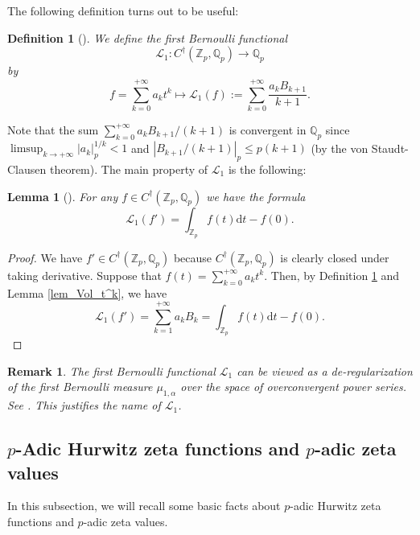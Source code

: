 \documentclass[12pt]{article}
\newtheorem{lemma}[theorem]{Lemma}
\newtheorem{definition}[theorem]{Definition}
\newtheorem{remark}[theorem]{Remark}
\numberwithin{equation}{section}
\begin{document}
The following definition turns out to be useful:

\begin{definition}[{\cite[Definition 2.6]{LS2023+}}]\label{def_L_1}
We define the \emph{first Bernoulli functional} \[\mathcal{L}_1: C^{\dagger}(\mathbb{Z}_p,\mathbb{Q}_p) \longrightarrow \mathbb{Q}_p\] 
by
\[ f = \sum_{k=0}^{+\infty} a_k t^{k} \mapsto \mathcal{L}_1(f) := \sum_{k=0}^{+\infty} \frac{a_kB_{k+1}}{k+1}. \]
\end{definition}
Note that the sum $\sum_{k=0}^{+\infty} a_kB_{k+1}/(k+1)$ is convergent in $\mathbb{Q}_p$ since $\limsup_{k \to +\infty} |a_k|_p^{1/k} < 1$ and $|B_{k+1}/(k+1)|_p \leqslant p(k+1)$ (by the von Staudt-Clausen theorem). The main property of $\mathcal{L}_1$ is the following:

\begin{lemma}[{\cite[Lemma 2.7]{LS2023+}}]\label{lem_L_1}
For any $f\in C^{\dagger}(\mathbb{Z}_p,\mathbb{Q}_p)$ we have the formula
\begin{equation*}
\mathcal{L}_1(f')=\int_{\mathbb{Z}_p} f(t) \mathrm{d}t - f(0).
\end{equation*}
\end{lemma}

\begin{proof}
We have $f' \in C^{\dagger}(\mathbb{Z}_p,\mathbb{Q}_p)$ because $C^{\dagger}(\mathbb{Z}_p,\mathbb{Q}_p)$ is clearly closed under taking derivative. Suppose that $f(t) = \sum_{k=0}^{+\infty} a_k t^k$. Then, by Definition \ref{def_L_1} and Lemma \ref{lem_Vol_t^k}, we have
\begin{equation*}
	\mathcal{L}_1(f') = \sum_{k=1}^{+\infty} a_kB_k = \int_{\mathbb{Z}_p} f(t) \mathrm{d}t - f(0).
\end{equation*}
\end{proof}

\begin{remark}
The first Bernoulli functional $\mathcal{L}_1$ can be viewed as a de-regularization of the first Bernoulli measure $\mu_{1,\alpha}$ over the space of overconvergent power series. See \cite[Proposition 2.9]{LS2023+}. This justifies the name of $\mathcal{L}_1$.
\end{remark}


\subsection{$p$-Adic Hurwitz zeta functions and $p$-adic zeta values}
In this subsection, we will recall some basic facts about $p$-adic Hurwitz zeta functions and $p$-adic zeta values.
\end{document}

